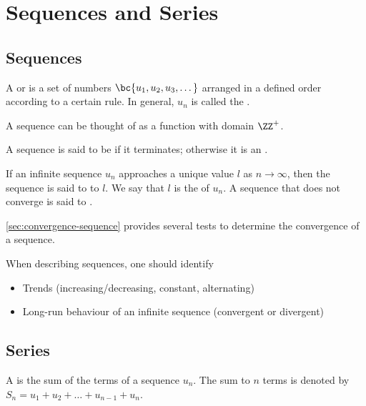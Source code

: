 \chapter{Sequences and Series}\label{chap:Sequences-and-Series}

\section{Sequences}

\begin{definition}
    A  or  is a set of numbers $\bc{u_1, u_2, u_3, \dots}$ arranged in a defined order according to a certain rule. In general, $u_n$ is called the .
\end{definition}

\begin{remark}
    A sequence can be thought of as a function with domain $\ZZ^+$.
\end{remark}

\begin{definition}
    A sequence is said to be  if it terminates; otherwise it is an .
\end{definition}

\begin{definition}
    If an infinite sequence $u_n$ approaches a unique value $l$ as $n \to \infty$, then the sequence is said to  to $l$. We say that $l$ is the  of $u_n$. A sequence that does not converge is said to .
\end{definition}

\SS\ref{sec:convergence-sequence} provides several tests to determine the convergence of a sequence.

When describing sequences, one should identify
\begin{itemize}
    \item Trends (increasing/decreasing, constant, alternating)
    \item Long-run behaviour of an infinite sequence (convergent or divergent)
\end{itemize}

\section{Series}

\begin{definition}
    A  is the sum of the terms of a sequence $u_n$. The sum to $n$ terms is denoted by $S_n = u_1 + u_2 + \dots + u_{n-1} + u_n$.
\end{definition}

